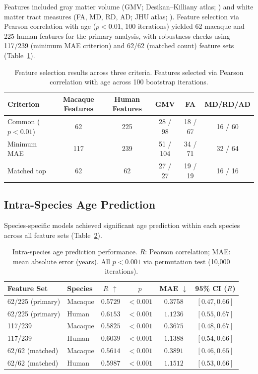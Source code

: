 \documentclass[11pt]{article}
\begin{document}
Features included gray matter volume (GMV; Desikan--Killiany atlas; \citealt{desikan2006automated}) and white matter tract measures (FA, MD, RD, AD; JHU atlas; \citealt{mori2005mri}). Feature selection via Pearson correlation with age ($p < 0.01$, 100 iterations) yielded 62 macaque and 225 human features for the primary analysis, with robustness checks using 117/239 (minimum MAE criterion) and 62/62 (matched count) feature sets (Table~\ref{tab:features}).

\begin{table}[H]
\centering
\caption{Feature selection results across three criteria. Features selected via Pearson correlation with age across 100 bootstrap iterations.}
\label{tab:features}
\begin{tabular}{lccccc}
\toprule
Criterion & Macaque Features & Human Features & GMV & FA & MD/RD/AD \\
\midrule
Common ($p < 0.01$) & 62 & 225 & 28 / 98 & 18 / 67 & 16 / 60 \\
Minimum MAE & 117 & 239 & 51 / 104 & 34 / 71 & 32 / 64 \\
Matched top & 62 & 62 & 27 / 27 & 19 / 19 & 16 / 16 \\
\bottomrule
\end{tabular}
\end{table}

\subsection{Intra-Species Age Prediction}

Species-specific models achieved significant age prediction within each species across all feature sets (Table~\ref{tab:intra}).

\begin{table}[H]
\centering
\caption{Intra-species age prediction performance. $R$: Pearson correlation; MAE: mean absolute error (years). All $p < 0.001$ via permutation test (10,000 iterations).}
\label{tab:intra}
\begin{tabular}{llcccc}
\toprule
Feature Set & Species & $R$ $\uparrow$ & $p$ & MAE $\downarrow$ & 95\% CI ($R$) \\
\midrule
62/225 (primary) & Macaque & $0.5729$ & $< 0.001$ & $0.3758$ & $[0.47, 0.66]$ \\
62/225 (primary) & Human & $0.6153$ & $< 0.001$ & $1.1236$ & $[0.55, 0.67]$ \\
117/239 & Macaque & $0.5825$ & $< 0.001$ & $0.3675$ & $[0.48, 0.67]$ \\
117/239 & Human & $0.6039$ & $< 0.001$ & $1.1388$ & $[0.54, 0.66]$ \\
62/62 (matched) & Macaque & $0.5614$ & $< 0.001$ & $0.3891$ & $[0.46, 0.65]$ \\
62/62 (matched) & Human & $0.5987$ & $< 0.001$ & $1.1512$ & $[0.53, 0.66]$ \\
\bottomrule
\end{tabular}
\end{table}
\end{document}
